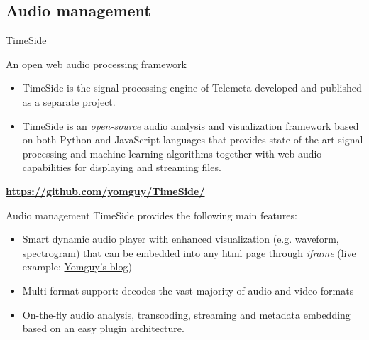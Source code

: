 \documentclass[final, hyperref, table]{beamer}
\begin{document}
\subsection{Audio management}
\begin{frame}{TimeSide}\scriptsize
 \begin{block}{An open web audio processing framework}
   \begin{itemize}
   \item TimeSide is the \alert{signal processing engine} of Telemeta developed and published as a separate project.
   \item TimeSide is an
     \emph{open-source} \alert{audio analysis and visualization framework} based on
     both \alert{Python} and \alert{JavaScript} languages that provides
     state-of-the-art signal processing and machine learning
     algorithms together with \alert{web audio} capabilities for displaying
     and streaming files.
   \end{itemize}
\vspace{-0.5cm}\begin{center}
  \colorbox{yellow!40}{\bf \url{https://github.com/yomguy/TimeSide/} }
\end{center}
\end{block}
\begin{block}{Audio management}
  TimeSide provides the following main features:
  \begin{itemize}
   \item Smart dynamic audio player with enhanced visualization (e.g. waveform,
    spectrogram) that can be embedded into any html page through \emph{iframe} (live example: \href{http://yomix.org/telemeta-1-embedded-timeside-player.html}{Yomguy's blog})
  \item Multi-format support: decodes the vast majority of audio and
    video formats%
  \item On-the-fly audio analysis, transcoding, streaming and metadata embedding
    based on an easy plugin architecture.
  \end{itemize}
\end{block}

 
\end{frame} 
\end{document}
